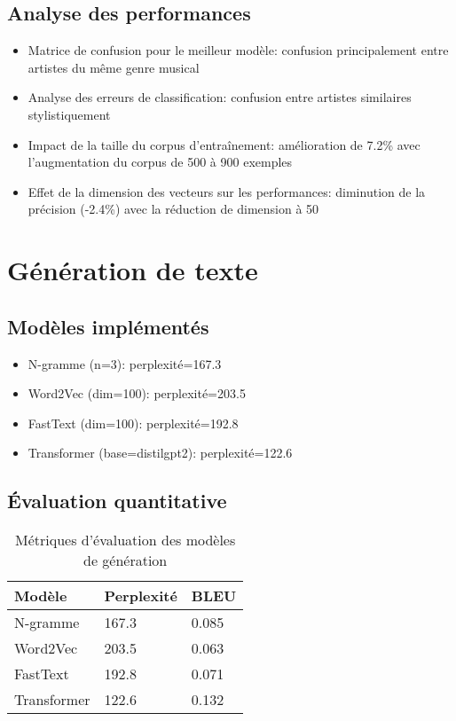 \documentclass[a4paper,11pt]{article}
\begin{document}
\subsection{Analyse des performances}
\begin{itemize}
    \item Matrice de confusion pour le meilleur modèle: confusion principalement entre artistes du même genre musical
    \item Analyse des erreurs de classification: confusion entre artistes similaires stylistiquement
    \item Impact de la taille du corpus d'entraînement: amélioration de 7.2\% avec l'augmentation du corpus de 500 à 900 exemples
    \item Effet de la dimension des vecteurs sur les performances: diminution de la précision (-2.4\%) avec la réduction de dimension à 50
\end{itemize}

\section{Génération de texte}
\label{sec:generation}

\subsection{Modèles implémentés}
\begin{itemize}
    \item N-gramme (n=3): perplexité=167.3
    \item Word2Vec (dim=100): perplexité=203.5
    \item FastText (dim=100): perplexité=192.8
    \item Transformer (base=distilgpt2): perplexité=122.6
\end{itemize}

\subsection{Évaluation quantitative}
\begin{table}[h]
\centering
\begin{tabular}{lll}
\toprule
\textbf{Modèle} & \textbf{Perplexité} & \textbf{BLEU} \\
\midrule
N-gramme & 167.3 & 0.085 \\
Word2Vec & 203.5 & 0.063 \\
FastText & 192.8 & 0.071 \\
Transformer & 122.6 & 0.132 \\
\bottomrule
\end{tabular}
\caption{Métriques d'évaluation des modèles de génération}
\label{tab:generation-metrics}
\end{table}
\end{document}
